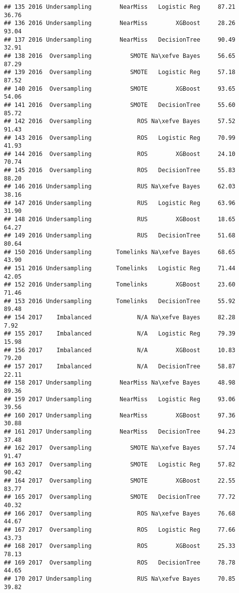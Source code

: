 \documentclass[
]{article}
\begin{document}
\begin{verbatim}
## 135 2016 Undersampling        NearMiss   Logistic Reg     87.21  36.76
## 136 2016 Undersampling        NearMiss        XGBoost     28.26  93.04
## 137 2016 Undersampling        NearMiss   DecisionTree     90.49  32.91
## 138 2016  Oversampling           SMOTE Na\xefve Bayes     56.65  87.29
## 139 2016  Oversampling           SMOTE   Logistic Reg     57.18  87.52
## 140 2016  Oversampling           SMOTE        XGBoost     93.65  54.06
## 141 2016  Oversampling           SMOTE   DecisionTree     55.60  85.72
## 142 2016  Oversampling             ROS Na\xefve Bayes     57.52  91.43
## 143 2016  Oversampling             ROS   Logistic Reg     70.99  41.93
## 144 2016  Oversampling             ROS        XGBoost     24.10  70.74
## 145 2016  Oversampling             ROS   DecisionTree     55.83  88.20
## 146 2016 Undersampling             RUS Na\xefve Bayes     62.03  38.16
## 147 2016 Undersampling             RUS   Logistic Reg     63.96  31.90
## 148 2016 Undersampling             RUS        XGBoost     18.65  64.27
## 149 2016 Undersampling             RUS   DecisionTree     51.68  80.64
## 150 2016 Undersampling       Tomelinks Na\xefve Bayes     68.65  43.90
## 151 2016 Undersampling       Tomelinks   Logistic Reg     71.44  42.05
## 152 2016 Undersampling       Tomelinks        XGBoost     23.60  71.46
## 153 2016 Undersampling       Tomelinks   DecisionTree     55.92  89.48
## 154 2017    Imbalanced             N/A Na\xefve Bayes     82.28   7.92
## 155 2017    Imbalanced             N/A   Logistic Reg     79.39  15.98
## 156 2017    Imbalanced             N/A        XGBoost     10.83  79.20
## 157 2017    Imbalanced             N/A   DecisionTree     58.87  22.11
## 158 2017 Undersampling        NearMiss Na\xefve Bayes     48.98  89.36
## 159 2017 Undersampling        NearMiss   Logistic Reg     93.06  39.56
## 160 2017 Undersampling        NearMiss        XGBoost     97.36  30.88
## 161 2017 Undersampling        NearMiss   DecisionTree     94.23  37.48
## 162 2017  Oversampling           SMOTE Na\xefve Bayes     57.74  91.47
## 163 2017  Oversampling           SMOTE   Logistic Reg     57.82  90.42
## 164 2017  Oversampling           SMOTE        XGBoost     22.55  83.77
## 165 2017  Oversampling           SMOTE   DecisionTree     77.72  40.32
## 166 2017  Oversampling             ROS Na\xefve Bayes     76.68  44.67
## 167 2017  Oversampling             ROS   Logistic Reg     77.66  43.73
## 168 2017  Oversampling             ROS        XGBoost     25.33  78.13
## 169 2017  Oversampling             ROS   DecisionTree     78.78  44.65
## 170 2017 Undersampling             RUS Na\xefve Bayes     70.85  39.82

\end{verbatim}
\end{document}
